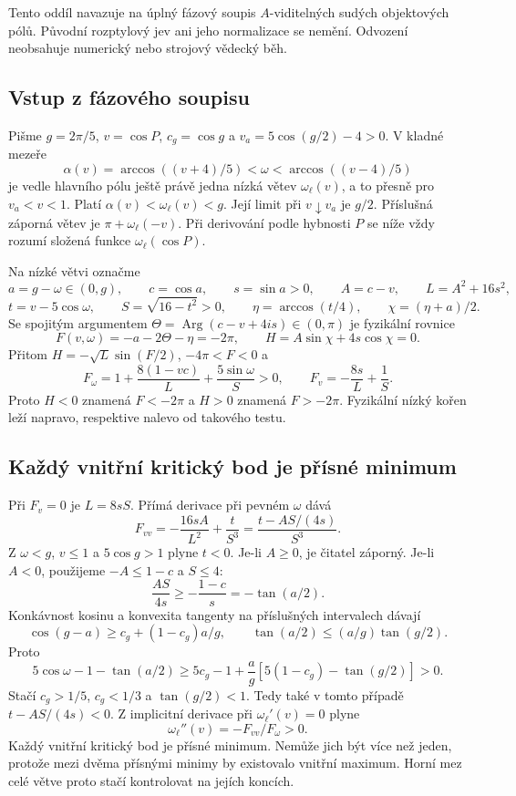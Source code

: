 \documentclass[11pt,a4paper]{article}
\theoremstyle{remark}\newtheorem{remark}[theorem]{Poznámka}
\numberwithin{equation}{section}
\begin{document}
Tento oddíl navazuje na úplný fázový soupis \(A\)-viditelných
sudých objektových pólů. Původní rozptylový jev ani jeho
normalizace se nemění. Odvození neobsahuje numerický nebo
strojový vědecký běh.

\subsection{Vstup z fázového soupisu}

Pišme \(g=2\pi/5\), \(v=\cos P\), \(c_g=\cos g\) a
\(v_a=5\cos(g/2)-4>0\). V kladné mezeře
\[
\alpha(v)=\arccos((v+4)/5)<\omega<\arccos((v-4)/5)
\]
je vedle hlavního pólu ještě právě jedna nízká větev
\(\omega_\ell(v)\), a to přesně pro \(v_a<v<1\). Platí
\(\alpha(v)<\omega_\ell(v)<g\). Její limit při
\(v\downarrow v_a\) je \(g/2\). Příslušná záporná větev je
\(\pi+\omega_\ell(-v)\). Při derivování podle hybnosti \(P\)
se níže vždy rozumí složená funkce \(\omega_\ell(\cos P)\).

Na nízké větvi označme
\[
a=g-\omega\in(0,g),\qquad c=\cos a,\qquad s=\sin a>0,
\qquad A=c-v,\qquad L=A^2+16s^2,
\]
\[
t=v-5\cos\omega,\qquad S=\sqrt{16-t^2}>0,
\qquad \eta=\arccos(t/4),\qquad \chi=(\eta+a)/2.
\]
Se spojitým argumentem
\(\Theta=\operatorname{Arg}(c-v+4is)\in(0,\pi)\) je
fyzikální rovnice
\[
F(v,\omega)=-a-2\Theta-\eta=-2\pi,
\qquad H=A\sin\chi+4s\cos\chi=0.
\tag{L1}
\]
Přitom \(H=-\sqrt L\sin(F/2)\), \(-4\pi<F<0\) a
\[
F_\omega=1+\frac{8(1-vc)}L+\frac{5\sin\omega}S>0,
\qquad F_v=-\frac{8s}L+\frac1S.
\tag{L2}
\]
Proto \(H<0\) znamená \(F<-2\pi\) a \(H>0\) znamená
\(F>-2\pi\). Fyzikální nízký kořen leží napravo, respektive
nalevo od takového testu.

\subsection{Každý vnitřní kritický bod je přísné minimum}

Při \(F_v=0\) je \(L=8sS\). Přímá derivace při pevném
\(\omega\) dává
\[
F_{vv}=-\frac{16sA}{L^2}+\frac{t}{S^3}
=\frac{t-AS/(4s)}{S^3}.
\tag{L3}
\]
Z \(\omega<g\), \(v\le1\) a \(5\cos g>1\) plyne
\(t<0\). Je-li \(A\ge0\), je čitatel záporný. Je-li
\(A<0\), použijeme \(-A\le1-c\) a \(S\le4\):
\[
\frac{AS}{4s}\ge-\frac{1-c}{s}=-\tan(a/2).
\]
Konkávnost kosinu a konvexita tangenty na příslušných intervalech
dávají
\[
\cos(g-a)\ge c_g+(1-c_g)a/g,
\qquad \tan(a/2)\le(a/g)\tan(g/2).
\]
Proto
\[
5\cos\omega-1-\tan(a/2)
\ge5c_g-1+\frac ag[5(1-c_g)-\tan(g/2)]>0.
\tag{L4}
\]
Stačí \(c_g>1/5\), \(c_g<1/3\) a \(\tan(g/2)<1\).
Tedy také v tomto případě \(t-AS/(4s)<0\). Z implicitní
derivace při \(\omega_\ell'(v)=0\) plyne
\[
\omega_\ell''(v)=-F_{vv}/F_\omega>0.
\tag{L5}
\]
Každý vnitřní kritický bod je přísné minimum. Nemůže jich být
více než jeden, protože mezi dvěma přísnými minimy by existovalo
vnitřní maximum. Horní mez celé větve proto stačí kontrolovat
na jejích koncích.
\end{document}
